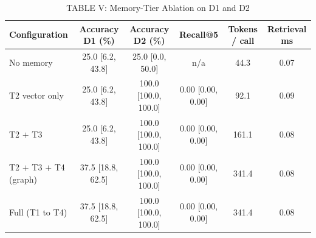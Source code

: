 \begin{table}[t]
\centering
\caption{TABLE V: Memory-Tier Ablation on D1 and D2}
\label{tab:memory_ablation}
\begin{tabular}{lccccc}
\toprule
Configuration & Accuracy D1 (\%) & Accuracy D2 (\%) & Recall@5 & Tokens / call & Retrieval ms \\
\midrule
No memory & 25.0 [6.2, 43.8] & 25.0 [0.0, 50.0] & n/a & 44.3 & 0.07 \\
T2 vector only & 25.0 [6.2, 43.8] & 100.0 [100.0, 100.0] & 0.00 [0.00, 0.00] & 92.1 & 0.09 \\
T2 $+$ T3 & 25.0 [6.2, 43.8] & 100.0 [100.0, 100.0] & 0.00 [0.00, 0.00] & 161.1 & 0.08 \\
T2 $+$ T3 $+$ T4 (graph) & 37.5 [18.8, 62.5] & 100.0 [100.0, 100.0] & 0.00 [0.00, 0.00] & 341.4 & 0.08 \\
Full (T1 to T4) & 37.5 [18.8, 62.5] & 100.0 [100.0, 100.0] & 0.00 [0.00, 0.00] & 341.4 & 0.08 \\
\bottomrule
\end{tabular}
\end{table}